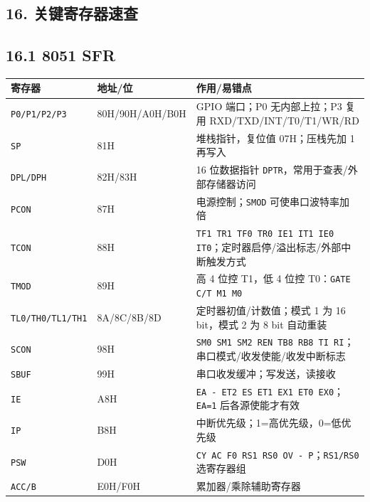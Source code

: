 \documentclass[UTF8,zihao=-5]{ctexart}
\renewcommand{\arraystretch}{0.9}
\begin{document}
\begin{multicols*}{2}
\section*{16. 关键寄存器速查}
\subsection*{16.1 8051 SFR}
{\scriptsize\setlength{\tabcolsep}{1.8pt}\renewcommand{\arraystretch}{0.88}%
\begin{tabularx}{\linewidth}{@{}*{3}{Y}@{}}
\toprule
\textbf{寄存器} & \textbf{地址/位} & \textbf{作用/易错点} \\
\midrule
\texttt{P0/P1/P2/P3} & 80H/90H/A0H/B0H & GPIO 端口；P0 无内部上拉；P3 复用 RXD/TXD/INT/T0/T1/WR/RD \\
\texttt{SP} & 81H & 堆栈指针，复位值 07H；压栈先加 1 再写入 \\
\texttt{DPL/DPH} & 82H/83H & 16 位数据指针 \texttt{DPTR}，常用于查表/外部存储器访问 \\
\texttt{PCON} & 87H & 电源控制；\texttt{SMOD} 可使串口波特率加倍 \\
\texttt{TCON} & 88H & \texttt{TF1 TR1 TF0 TR0 IE1 IT1 IE0 IT0}；定时器启停/溢出标志/外部中断触发方式 \\
\texttt{TMOD} & 89H & 高 4 位控 T1，低 4 位控 T0：\texttt{GATE C/T M1 M0} \\
\texttt{TL0/TH0/TL1/TH1} & 8A/8C/8B/8D & 定时器初值/计数值；模式 1 为 16 bit，模式 2 为 8 bit 自动重装 \\
\texttt{SCON} & 98H & \texttt{SM0 SM1 SM2 REN TB8 RB8 TI RI}；串口模式/收发使能/收发中断标志 \\
\texttt{SBUF} & 99H & 串口收发缓冲；写发送，读接收 \\
\texttt{IE} & A8H & \texttt{EA - ET2 ES ET1 EX1 ET0 EX0}；\texttt{EA=1} 后各源使能才有效 \\
\texttt{IP} & B8H & 中断优先级；1=高优先级，0=低优先级 \\
\texttt{PSW} & D0H & \texttt{CY AC F0 RS1 RS0 OV - P}；\texttt{RS1/RS0} 选寄存器组 \\
\texttt{ACC/B} & E0H/F0H & 累加器/乘除辅助寄存器 \\
\bottomrule
\end{tabularx}}

\end{multicols*}
\end{document}
